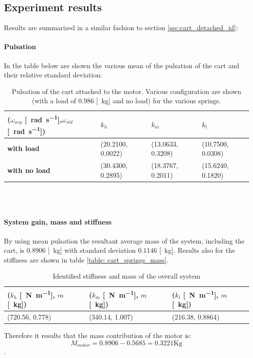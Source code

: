 \subsection{Experiment results}
Results are summarized in a similar fashion to section \ref{sec:cart_detached_id}:
\paragraph{Pulsation}
In the table below are shown the various mean of the pulsation of the cart and their relative standard deviation:
\begin{table}[!h]
\centering

\label{table: cart_attached_omega}
\begin{tabular}{|l|l|l|l|}
\hline
{(\textbf{$\omega_{avg}$} [\SI{}{\radian \per \second}],$\omega_{std}$ [\SI{}{\radian \per \second}])} & \textbf{$k_h$} & \textbf{$k_m$}   & \textbf{$k_l$}   \\ \hline
\textbf{with load}         & (20.2100, 0.0022)    & (13.0633, 0.3208) & (10.7500, 0.0308)      \\ \hline
\textbf{with no load}      & (30.4300, 0.2895)    & (18.3767, 0.2011) & (15.6240, 0.1820) \\ \hline
\end{tabular}
\caption{Pulsation of the cart  attached to the motor. Various configuration are shown (with a load of $0.986$ [\SI{}{\kilo \gram}] and no load) for the various springs. }
\end{table} \\ \\


\paragraph{System gain, mass and  stiffness}
By using   mean pulsation the resultant average mass of the system, including the cart, is $ 0.8906$ [\SI{}{\kilo\gram}] with standard deviation $  0.1146$ [\SI{}{\kilo \gram}]. Results also for the stiffness  are shown in table \ref{table: cart_springs_mass}.
\begin{table}[!h]
\centering
\label{table: cart_attached_springs_mass}
\begin{tabular}{|l|l|l|}
\hline
{\textbf{($k_h$ [\SI{}{\newton \per \metre}], $m$ [\SI{}{\kilo \gram}])}} & \textbf{($k_m$ [\SI{}{\newton \per \metre}], $m$ [\SI{}{\kilo \gram}])} & \textbf{($k_l$ [\SI{}{\newton \per \metre}], $m$ [\SI{}{\kilo \gram}])} \\ \hline
(720.56, 0.778)              & (340.14, 1.007)     & (216.38, 0.8864)     \\ \hline
\end{tabular}
\caption{Identified stiffness and mass of the overall system}
\end{table}
Therefore it results that the mass contribution of the motor is:
$$M_{motor} = 0.8906 -0.5685=0.3221 \text{Kg}$$.

